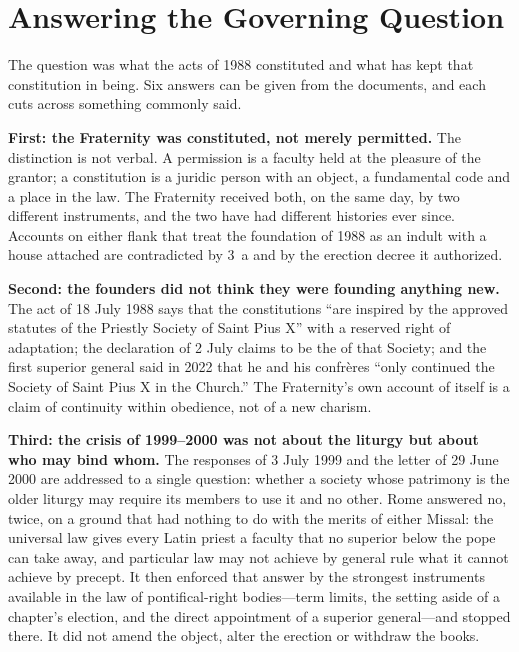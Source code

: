 \section{Answering the Governing Question}

The question was what the acts of 1988 constituted and what has kept that
constitution in being. Six answers can be given from the documents, and
each cuts across something commonly said.

\textbf{First: the Fraternity was constituted, not merely permitted.} The
distinction is not verbal. A permission is a faculty held at the pleasure
of the grantor; a constitution is a juridic person with an object, a
fundamental code and a place in the law. The Fraternity received both, on
the same day, by two different instruments, and the two have had
different histories ever since. Accounts on either flank that treat the
foundation of 1988 as an indult with a house attached are contradicted by
 3~a and by the erection decree it authorized.

\textbf{Second: the founders did not think they were founding anything
new.} The act of 18 July 1988 says that the constitutions ``are inspired
by the approved statutes of the Priestly Society of Saint Pius X'' with a
reserved right of adaptation; the declaration of 2 July claims to be the
 of that Society; and the first superior general said
in 2022 that he and his confrères ``only continued the Society of Saint
Pius X in the Church.'' The Fraternity's own account of itself is a claim
of continuity within obedience, not of a new charism.

\textbf{Third: the crisis of 1999--2000 was not about the liturgy but
about who may bind whom.} The responses of 3 July 1999 and the letter of
29 June 2000 are addressed to a single question: whether a society whose
patrimony is the older liturgy may require its members to use it and no
other. Rome answered no, twice, on a ground that had nothing to do with
the merits of either Missal: the universal law gives every Latin priest a
faculty that no superior below the pope can take away, and particular law
may not achieve by general rule what it cannot achieve by precept. It then
enforced that answer by the strongest instruments available in the law of
pontifical-right bodies---term limits, the setting aside of a chapter's
election, and the direct appointment of a superior general---and stopped
there. It did not amend the object, alter the erection or withdraw the
books.

